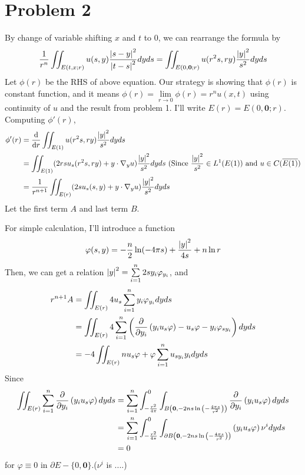 \documentclass{article}
\begin{document}
\section*{Problem 2}
By change of variable shifting $x$ and $t$ to 0, we can rearrange the formula by \begin{equation*}
\frac{1}{r^n}\iint_{E(t,x;r)}u(s,y)\frac{\abs{s-y}^2}{\abs{t-s}^2}dyds=\iint_{E(0,\bm{0};r)}u(r^2s,ry)\frac{\abs{y}^2}{s^2}dyds
\end{equation*}
Let $\phi(r)$ be the RHS of above equation. Our strategy is showing that $\phi(r)$ is constant function, and it means $\phi(r)=\lim\limits_{r\rightarrow 0} \phi(r)=r^n u(x,t)$ using continuity of $u$ and the result from problem 1. I'll write $E(r)=E(0,\bm{0};r)$.
Computing $\phi'(r)$,
\begin{equation*}
\begin{split}
\phi'(r)&=\dv{r}\iint_{E(1)} u(r^2s,ry)\frac{\abs{y}^2}{s^2}dyds \\
&= \iint_{E(1)}(2rsu_s(r^2s, ry)+y\cdot \nabla_y u)\frac{\abs{y}^2}{s^2}dyds \text { (Since }\frac{\abs{y}^2}{s^2}\in L^1(E(1)) \text{ and } u\in C(\overline{E(1)}) \\
&= \frac{1}{r^{n+1}}\iint_{E(r)}(2su_s(s,y)+y\cdot \nabla_y u)\frac{\abs{y}^2}{s^2}dyds
\end{split}
\end{equation*}
Let the first term $A$ and last term $B$.

For simple calculation, I'll introduce a function
\begin{equation*}
\varphi(s, y)= -\frac{n}{2}\ln(-4\pi s)+\frac{\abs{y}^2}{4s}+n\ln r
\end{equation*}
Then, we can get a relation $\abs{y}^2=\sum\limits_{i=1}^n 2sy_i\varphi_{y_i}$, and
\begin{equation*}
\begin{split}
r^{n+1}A&=\iint_{E(r)} 4u_s \sum\limits_{i=1}^n y_i \varphi_{y_i} dyds \\
&=\iint_{E(r)} 4 \sum\limits_{i=1}^n \left(\pdv{y_i}\left(y_iu_s\varphi\right)-u_s\varphi-y_i\varphi_{sy_i}\right) dyds \\
&=-4\iint_{E(r)} nu_s\varphi + \varphi\sum\limits_{i=1}^n u_{sy_i} y_i  dyds
\end{split}
\end{equation*}
Since
\begin{equation*}
\begin{split}
\iint_{E(r)} \sum\limits_{i=1}^n \pdv{y_i}\left(y_i u_s\varphi\right) dyds&=\sum\limits_{i=1}^n \int_{-\frac{r^2}{4\pi}}^0 \int_{B\left(\bm{0}, -2ns \ln{\left(-\frac{4\pi s}{r^2}\right)}\right)}  \pdv{y_i}\left(y_i u_s\varphi\right) dyds \\
&=\sum\limits_{i=1}^n \int_{-\frac{r^2}{4\pi}}^0 \int_{\partial B\left(\bm{0}, -2ns \ln{\left(-\frac{4\pi s}{r^2}\right)}\right)}  \left(y_i u_s\varphi\right)\nu^i dyds \\
&=0
\end{split}
\end{equation*}
for $\varphi\equiv 0$ in $\partial E-\{0,\bm{0}\}$.($\nu^i$ is ....)
\end{document}
